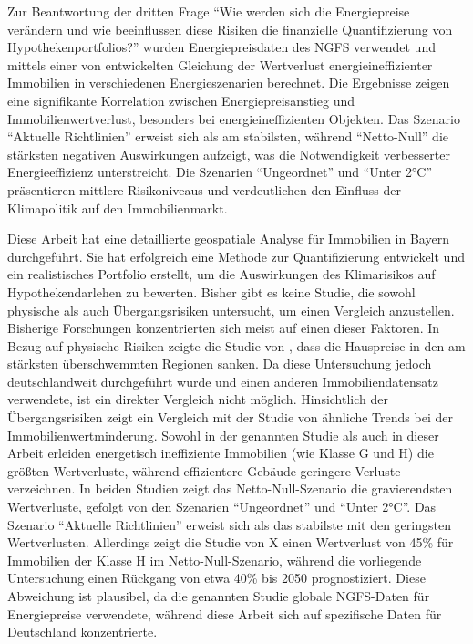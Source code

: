 Zur Beantwortung der dritten Frage \enquote{Wie werden sich die Energiepreise verändern und wie beeinflussen diese Risiken die finanzielle Quantifizierung von Hypothekenportfolios?} wurden Energiepreisdaten des NGFS verwendet und mittels einer von \textcite{tergerman} entwickelten Gleichung der Wertverlust energieineffizienter Immobilien in verschiedenen Energieszenarien berechnet. Die Ergebnisse zeigen eine signifikante Korrelation zwischen Energiepreisanstieg und Immobilienwertverlust, besonders bei energieineffizienten Objekten. Das Szenario \enquote{Aktuelle Richtlinien} erweist sich als am stabilsten, während \enquote{Netto-Null} die stärksten negativen Auswirkungen aufzeigt, was die Notwendigkeit verbesserter Energieeffizienz unterstreicht. Die Szenarien \enquote{Ungeordnet} und \enquote{Unter 2°C} präsentieren mittlere Risikoniveaus und verdeutlichen den Einfluss der Klimapolitik auf den Immobilienmarkt.

Diese Arbeit hat eine detaillierte geospatiale Analyse für Immobilien in Bayern durchgeführt. Sie hat erfolgreich eine Methode zur Quantifizierung entwickelt und ein realistisches Portfolio erstellt, um die Auswirkungen des Klimarisikos auf Hypothekendarlehen zu bewerten.  Bisher gibt es keine Studie, die sowohl physische als auch Übergangsrisiken untersucht, um einen Vergleich anzustellen. Bisherige Forschungen konzentrierten sich meist auf einen dieser Faktoren. In Bezug auf physische Risiken zeigte die Studie von \textcite{moore2022flood}, dass die Hauspreise in den am stärksten überschwemmten Regionen sanken. Da diese Untersuchung jedoch deutschlandweit durchgeführt wurde und einen anderen Immobiliendatensatz verwendete, ist ein direkter Vergleich nicht möglich. Hinsichtlich der Übergangsrisiken zeigt ein Vergleich mit der Studie von \textcite{tergerman} ähnliche Trends bei der Immobilienwertminderung. Sowohl in der genannten Studie als auch in dieser Arbeit erleiden energetisch ineffiziente Immobilien (wie Klasse G und H) die größten Wertverluste, während effizientere Gebäude geringere Verluste verzeichnen. In beiden Studien zeigt das Netto-Null-Szenario die gravierendsten Wertverluste, gefolgt von den Szenarien \enquote{Ungeordnet} und \enquote{Unter 2°C}. Das Szenario \enquote{Aktuelle Richtlinien} erweist sich als das stabilste mit den geringsten Wertverlusten. Allerdings zeigt die Studie von X einen Wertverlust von 45\% für Immobilien der Klasse H im Netto-Null-Szenario, während die vorliegende Untersuchung einen Rückgang von etwa 40\% bis 2050 prognostiziert. Diese Abweichung ist plausibel, da die genannten Studie globale NGFS-Daten für Energiepreise verwendete, während diese Arbeit sich auf spezifische Daten für Deutschland konzentrierte.

